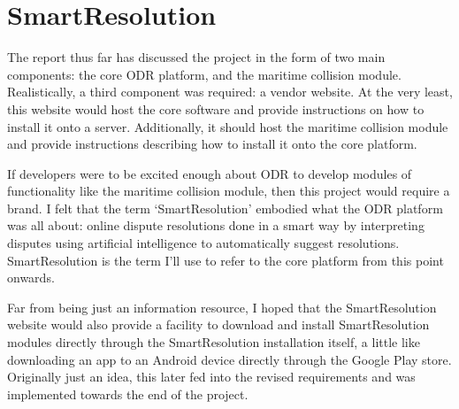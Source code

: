 \section{SmartResolution}

The report thus far has discussed the project in the form of two main components: the core ODR platform, and the maritime collision module. Realistically, a third component was required: a vendor website. At the very least, this website would host the core software and provide instructions on how to install it onto a server. Additionally, it should host the maritime collision module and provide instructions describing how to install it onto the core platform.

If developers were to be excited enough about ODR to develop modules of functionality like the maritime collision module, then this project would require a brand. I felt that the term `SmartResolution' embodied what the ODR platform was all about: online dispute resolutions done in a smart way by interpreting disputes using artificial intelligence to automatically suggest resolutions. SmartResolution is the term I'll use to refer to the core platform from this point onwards.

Far from being just an information resource, I hoped that the SmartResolution website would also provide a facility to download and install SmartResolution modules directly through the SmartResolution installation itself, a little like downloading an app to an Android device directly through the Google Play store. Originally just an idea, this later fed into the revised requirements and was implemented towards the end of the project.
